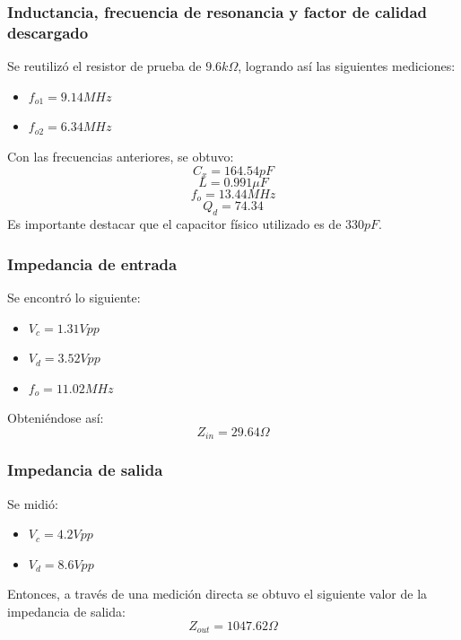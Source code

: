 \documentclass{article}
\begin{document}
\subsubsection{Inductancia, frecuencia de resonancia y factor de calidad descargado}
Se reutilizó el resistor de prueba de $9.6 k\Omega$, logrando así las siguientes mediciones:
\begin{itemize}
    \item $	f_{o1}=9.14 MHz$
    \item $	f_{o2}=6.34 MHz$
\end{itemize}
\noindent Con las frecuencias anteriores, se obtuvo:
\begin{equation*}
    C_x=164.54 pF
\end{equation*}
\begin{equation*}
    L=0.991 \mu F
\end{equation*}
\begin{equation*}
    f_o=13.44 MHz
\end{equation*}
\begin{equation*}
    Q_d=74.34
\end{equation*}
\noindent Es importante destacar que el capacitor físico utilizado es de $330 pF$.
\subsubsection{Impedancia de entrada}
Se encontró lo siguiente:
\begin{itemize}
    \item $	V_c=1.31 Vpp$
    \item $	V_d=3.52 Vpp$    
    \item $ f_o=11.02 MHz$
\end{itemize}
\noindent Obteniéndose así:
\begin{equation*}
    Z_{in}=29.64 \Omega
\end{equation*}
\subsubsection{Impedancia de salida}
Se midió:
\begin{itemize}
    \item $	V_c=4.2 Vpp$
    \item $	V_d=8.6 Vpp$
\end{itemize}
\noindent Entonces, a través de una medición directa se obtuvo el siguiente valor de la impedancia de salida:
\begin{equation*}
    Z_{out}=1047.62 \Omega
\end{equation*}
\end{document}
